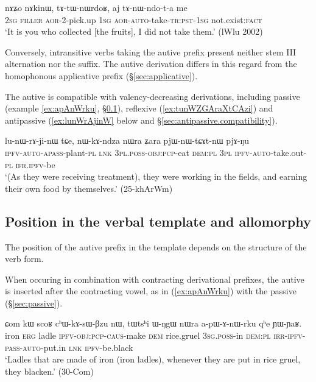  \begin{exe}
\ex \label{ex:aj.tAnWndota.me}
\gll nɤʑo nɤkinɯ, tɤ-tɯ-nɯrdoʁ, aj tɤ-nɯ-ndo-t-a me\\
\textsc{2sg} \textsc{filler} \textsc{aor}-2-pick.up  \textsc{1sg}  \textsc{aor}-\textsc{auto}-take-\textsc{tr}:\textsc{pst}-\textsc{1sg} not.exist:\textsc{fact}\\
\glt `It is you who collected [the fruits], I did not take them.' (lWlu 2002)
\end{exe}

Conversely, intransitive verbs taking the autive prefix present neither stem III alternation nor the  suffix. The autive derivation differs in this regard from the homophonous  applicative prefix (§\ref{sec:applicative}).

The autive is compatible with valency-decreasing derivations, including passive (example \ref{ex:apAnWrku}, §\ref{sec:autoben.position}), reflexive (\ref{ex:tunWZGAraXtCAzi}) and antipassive (\ref{ex:lunWrAjinW} below and §\ref{sec:antipassive.compatibility}).

 \begin{exe}
\ex \label{ex:lunWrAjinW}
\gll lu-nɯ-rɤ-ji-nɯ tɕe, nɯ-kɤ-ndza nɯra ʑara pjɯ-nɯ-tɕɤt-nɯ pjɤ-ŋu \\
\textsc{ipfv}-\textsc{auto}-\textsc{apass}-plant-\textsc{pl} \textsc{lnk} \textsc{3pl}.\textsc{poss}-\textsc{obj}:\textsc{pcp}-eat \textsc{dem}:\textsc{pl} \textsc{3pl} \textsc{ipfv}-\textsc{auto}-take.out-\textsc{pl} \textsc{ifr}.\textsc{ipfv}-be \\
\glt  `(As they were receiving treatment), they were working in the fields, and earning their own food by themselves.' (25-khArWm) 
\end{exe}

\subsection{Position in the verbal template and allomorphy}  \label{sec:autoben.position}
 

The position of the autive prefix in the template depends on the structure of the verb form. 

When occuring in combination with contracting derivational prefixes, the autive  is inserted after the contracting vowel, as in (\ref{ex:apAnWrku}) with the passive  (§\ref{sec:passive}).

 \begin{exe}
\ex \label{ex:apAnWrku}
\gll ɕom kɯ scoʁ cʰɯ-kɤ-sɯ-βzu nɯ, tɯtsʰi ɯ-ŋgɯ nɯra a-pɯ-ɤ-nɯ-rku qʰe ɲɯ-ɲaʁ.  \\
iron \textsc{erg} ladle \textsc{ipfv}-\textsc{obj}:\textsc{pcp}-\textsc{caus}-make \textsc{dem} rice.gruel \textsc{3sg}.\textsc{poss}-in \textsc{dem}:\textsc{pl} \textsc{irr}-\textsc{ipfv}-\textsc{pass}-\textsc{auto}-put.in \textsc{lnk} \textsc{ipfv}-be.black \\
\glt `Ladles that are made of iron (iron ladles), whenever they are put in rice gruel, they blacken.' (30-Com) 
\end{exe}

